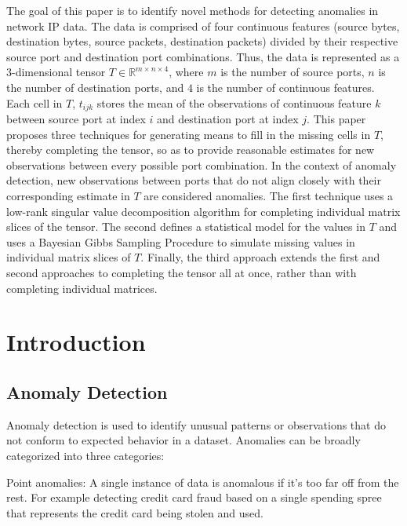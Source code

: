 \documentclass[12pt,twoside]{dukestatscithesis}
\theoremstyle{definition}
\theoremstyle{definition}
\theoremstyle{definition}
\theoremstyle{remark}
\begin{document}
\mainmatter %
\pagestyle{fancyplain} %

The goal of this paper is to identify novel methods for detecting
anomalies in network IP data. The data is comprised of four continuous
features (source bytes, destination bytes, source packets, destination
packets) divided by their respective source port and destination port
combinations. Thus, the data is represented as a 3-dimensional tensor
\(T \in \mathbb{R}^{m \times n \times 4}\), where \(m\) is the number of
source ports, \(n\) is the number of destination ports, and \(4\) is the
number of continuous features. Each cell in \(T\), \(t_{ijk}\) stores
the mean of the observations of continuous feature \(k\) between source
port at index \(i\) and destination port at index \(j\). This paper
proposes three techniques for generating means to fill in the missing
cells in \(T\), thereby completing the tensor, so as to provide
reasonable estimates for new observations between every possible port
combination. In the context of anomaly detection, new observations
between ports that do not align closely with their corresponding
estimate in \(T\) are considered anomalies. The first technique uses a
low-rank singular value decomposition algorithm for completing
individual matrix slices of the tensor. The second defines a statistical
model for the values in \(T\) and uses a Bayesian Gibbs Sampling
Procedure to simulate missing values in individual matrix slices of
\(T\). Finally, the third approach extends the first and second
approaches to completing the tensor all at once, rather than with
completing individual matrices.

\chapter{Introduction}\label{introduction}

\section{Anomaly Detection}\label{anomaly-detection}

Anomaly detection is used to identify unusual patterns or observations
that do not conform to expected behavior in a dataset. Anomalies can be
broadly categorized into three categories:

Point anomalies: A single instance of data is anomalous if it's too far
off from the rest. For example detecting credit card fraud based on a
single spending spree that represents the credit card being stolen and
used.
\end{document}
